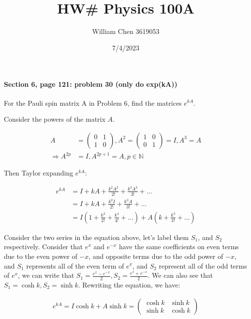 \documentclass{article}
\title{HW\# Physics 100A}
\date{7/4/2023}
\author{William Chen 3619053}
\begin{document}
\maketitle

\paragraph{Section 6, page 121: problem 30 (only do exp(kA))}
For the Pauli spin matrix A in Problem 6, find the matrices $e^{kA}$.

Consider the powers of the matrix $A$.

\begin{align*}
A &= \begin{pmatrix}
0 & 1 \\ 1 & 0
\end{pmatrix}, 
A^2 = \begin{pmatrix}
1 & 0 \\ 0 & 1
\end{pmatrix} = I, 
A^3 = A \\
\Rightarrow A^{2p} &= I, A^{2p+1} = A, p \in \mathbb{N} 
\end{align*}

Then Taylor expanding $e^{kA}$:

\begin{align*}
e^{kA} &= I + kA + \frac{k^2 A^2}{2!} + \frac{k^3A^3}{3!} + \ldots  \\
&= I + kA + \frac{k^2 I}{2!} + \frac{k^3A}{3!} + \ldots  \\
&= I(1 + \frac{k^2}{2!} + \frac{k^4}{4!} + \ldots ) + A (k + \frac{k^3}{3!} + \ldots ) 
\end{align*}

Consider the two series in the equation above, let's label them $S_1$, and $S_2$ respectively. Consider that $e^x$ and $e^{-x}$ have the same coefficients on even terms due to the even power of $-x$, and opposite terms due to the odd power of $-x$, and $S_1$ represents all of the even term of $e^x$, and $S_2$ represent all of the odd terms of $e^{x}$, we can write that $S_1 = \frac{e^{x} - e^{-x}}{2}, S_2 = \frac{e^{x} + e^{-x}}{2}$. We can also see that $S_1 = \cosh k, S_2 = \sinh k$. Rewriting the equation, we have:

\begin{align*}
e^{kA} = I \cosh k + A \sinh k = \begin{pmatrix}
\cosh k & \sinh k \\ \sinh k & \cosh k
\end{pmatrix}
\end{align*}
\end{document}
